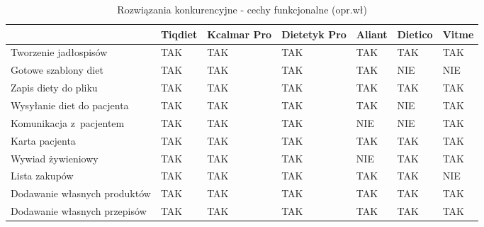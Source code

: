 \begin{minipage}{\textwidth}
    \begin{table}[H]
        \centering\caption{Rozwiązania konkurencyjne - cechy funkcjonalne (opr.wł)\label{tabela:rozwiazania-konkurencyjne-funkcjonalne}}
        \begin{tabular}{|P{.22\textwidth}|P{.09\textwidth}|P{.09\textwidth}|P{.09\textwidth}|P{.09\textwidth}|P{.09\textwidth}|P{.09\textwidth}|}
            \hline
                                                & Tiqdiet   & Kcalmar Pro   & Dietetyk Pro & Aliant         & Dietico   & Vitme   \\ \hline
            Tworzenie jadłospisów               & TAK       & TAK           & TAK          & TAK            & TAK       & TAK     \\ \hline
            Gotowe szablony diet                & TAK       & TAK           & TAK          & TAK            & NIE       & NIE     \\ \hline
            Zapis diety do pliku                & TAK       & TAK           & TAK          & TAK            & TAK       & TAK     \\ \hline
            Wysyłanie diet do pacjenta          & TAK       & TAK           & TAK          & TAK            & NIE       & TAK     \\ \hline
            Komunikacja z~pacjentem             & TAK       & TAK           & TAK          & NIE            & NIE       & TAK     \\ \hline
            Karta pacjenta                      & TAK       & TAK           & TAK          & TAK            & TAK       & TAK     \\ \hline
            Wywiad żywieniowy                   & TAK       & TAK           & TAK          & NIE            & TAK       & TAK     \\ \hline
            Lista zakupów                       & TAK       & TAK           & TAK          & TAK            & TAK       & NIE     \\ \hline
            Dodawanie własnych produktów        & TAK       & TAK           & TAK          & TAK            & TAK       & TAK     \\ \hline
            Dodawanie własnych przepisów        & TAK       & TAK           & TAK          & TAK            & TAK       & TAK     \\ \hline
        \end{tabular}
    \end{table}
\end{minipage}

